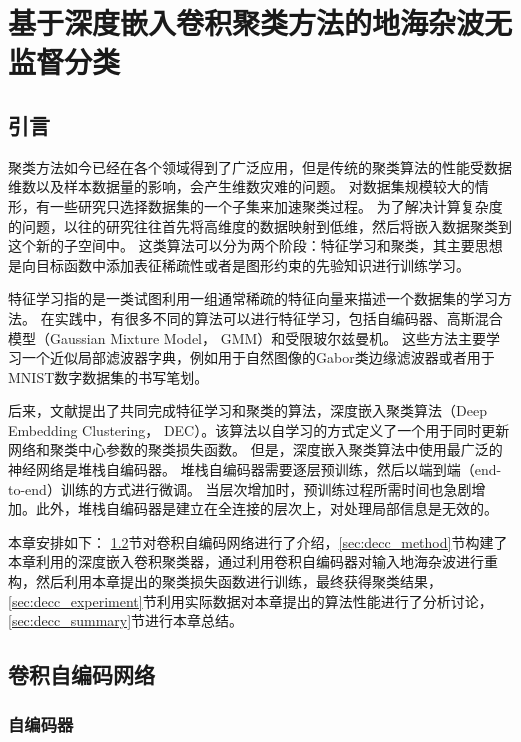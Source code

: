 
\chapter{基于深度嵌入卷积聚类方法的地海杂波无监督分类}
\label{sec:decc}
\section{引言}
聚类方法如今已经在各个领域得到了广泛应用，但是传统的聚类算法的性能受数据维数以及样本数据量的影响，会产生维数灾难的问题。
对数据集规模较大的情形，有一些研究只选择数据集的一个子集来加速聚类过程。
为了解决计算复杂度的问题，以往的研究往往首先将高维度的数据映射到低维，然后将嵌入数据聚类到这个新的子空间中。
这类算法可以分为两个阶段：特征学习和聚类，其主要思想是向目标函数中添加表征稀疏性或者是图形约束的先验知识进行训练学习。

特征学习指的是一类试图利用一组通常稀疏的特征向量来描述一个数据集的学习方法。
在实践中，有很多不同的算法可以进行特征学习，包括自编码器、高斯混合模型（Gaussian Mixture Model， GMM）和受限玻尔兹曼机。
这些方法主要学习一个近似局部滤波器字典，例如用于自然图像的Gabor类边缘滤波器或者用于MNIST数字数据集的书写笔划。

后来，文献\cite{xie2016unsupervised}提出了共同完成特征学习和聚类的算法，深度嵌入聚类算法（Deep Embedding Clustering， DEC）。该算法以自学习的方式定义了一个用于同时更新网络和聚类中心参数的聚类损失函数。
但是，深度嵌入聚类算法中使用最广泛的神经网络是堆栈自编码器。
堆栈自编码器需要逐层预训练，然后以端到端（end-to-end）训练的方式进行微调。
当层次增加时，预训练过程所需时间也急剧增加。此外，堆栈自编码器是建立在全连接的层次上，对处理局部信息是无效的。

本章安排如下： \ref{sec:cae}节对卷积自编码网络进行了介绍，\ref{sec:decc_method}节构建了本章利用的深度嵌入卷积聚类器，通过利用卷积自编码器对输入地海杂波进行重构，然后利用本章提出的聚类损失函数进行训练，最终获得聚类结果，\ref{sec:decc_experiment}节利用实际数据对本章提出的算法性能进行了分析讨论，\ref{sec:decc_summary}节进行本章总结。

\section{卷积自编码网络}
\label{sec:cae}
\subsection{自编码器}

